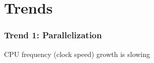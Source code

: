 \section{Trends}

\begin{frame}
    \frametitle{Trend 1: Parallelization}

    CPU frequency (clock speed) growth is slowing

    \begin{figure}
       \begin{center}
       \end{center}
    \end{figure}

\end{frame}


